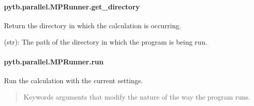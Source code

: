 \documentclass[letterpaper,10pt,english,openany,oneside]{sphinxmanual}
\begin{document}
\begin{fulllineitems}
\paragraph{pytb.parallel.MPRunner.get\_directory}
\label{\detokenize{api/pytb.parallel.MPRunner.get_directory:pytb-parallel-mprunner-get-directory}}\label{\detokenize{api/pytb.parallel.MPRunner.get_directory::doc}}

\begin{fulllineitems}
\label{\detokenize{api/pytb.parallel.MPRunner.get_directory:pytb.parallel.MPRunner.get_directory}}
\pysigstartsignatures
{}
\pysigstopsignatures
\sphinxAtStartPar
Return the directory in which the calculation is occurring.
\begin{description}
\sphinxAtStartPar
(str): The path of the directory in which the program is being run.

\end{description}

\end{fulllineitems}


\sphinxstepscope


\paragraph{pytb.parallel.MPRunner.run}
\label{\detokenize{api/pytb.parallel.MPRunner.run:pytb-parallel-mprunner-run}}\label{\detokenize{api/pytb.parallel.MPRunner.run::doc}}

\begin{fulllineitems}
\label{\detokenize{api/pytb.parallel.MPRunner.run:pytb.parallel.MPRunner.run}}
\pysigstartsignatures
{}
\pysigstopsignatures
\sphinxAtStartPar
Run the calculation with the current settings.
\begin{quote}\begin{description}
\sphinxAtStartPar
{} \textendash{} Keywords arguments that modify the nature of the
way the program runs.


\end{description}
\end{quote}
\end{fulllineitems}
\end{fulllineitems}
\end{document}
